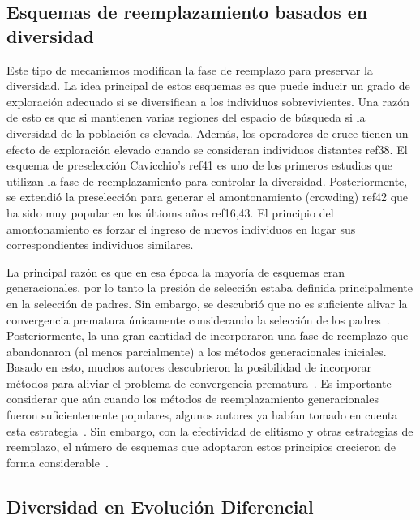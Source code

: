 \subsection{Esquemas de reemplazamiento basados en diversidad}

Este tipo de mecanismos modifican la fase de reemplazo para preservar la diversidad.
%
La idea principal de estos esquemas es que puede inducir un grado de exploración adecuado si se diversifican a los individuos sobrevivientes.
%
Una razón de esto es que si mantienen varias regiones del espacio de búsqueda si la diversidad de la población es elevada.
%
Además, los operadores de cruce tienen un efecto de exploración elevado cuando se consideran individuos distantes ref38.
%
El esquema de preselección Cavicchio's ref41 es uno de los primeros estudios que utilizan la fase de reemplazamiento para controlar la diversidad.
%
Posteriormente, se extendió la preselección para generar el amontonamiento (crowding) ref42 que ha sido muy popular en los últioms años ref16,43.
%
El principio del amontonamiento es forzar el ingreso de nuevos individuos en lugar sus correspondientes individuos similares.
%

La principal razón es que en esa época la mayoría de esquemas eran generacionales, por lo tanto la presión de selección estaba definida principalmente en la selección de padres.
%
Sin embargo, se descubrió que no es suficiente alivar la convergencia prematura únicamente considerando la selección de los padres~\cite{blickle1996comparison}.
%
Posteriormente, la una gran cantidad de \EAS{} incorporaron una fase de reemplazo que abandonaron (al menos parcialmente) a los métodos generacionales iniciales.
%
Basado en esto, muchos autores descubrieron la posibilidad de incorporar métodos para aliviar el problema de convergencia prematura~\cite{Crepinsek:13}.
%
Es importante considerar que aún cuando los métodos de reemplazamiento generacionales~\cite{de2006evolutionary} fueron suficientemente populares, algunos autores ya habían tomado en cuenta esta estrategia~\cite{mahfoud1992crowding}.
%
Sin embargo, con la efectividad de elitismo y otras estrategias de reemplazo, el número de esquemas que adoptaron estos principios crecieron de forma considerable~\cite{lozano2008replacement}.
%
\subsection{Diversidad en Evolución Diferencial}

